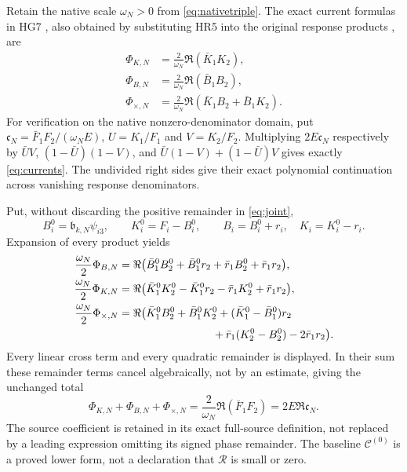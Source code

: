\documentclass[11pt]{article}
\begin{document}
Retain the native scale $\omega_N>0$ from \eqref{eq:nativetriple}.
The exact current formulas in HG7 \cite{HG}, also obtained by
substituting HR5 into the original response products \cite{HR}, are
\begin{equation}\label{eq:currents}
 \begin{aligned}
 \Phi_{K,N}&=\frac2{\omega_N}\Re(\bar K_1K_2),\\
 \Phi_{B,N}&=\frac2{\omega_N}\Re(\bar B_1B_2),\\
 \Phi_{\times,N}&=\frac2{\omega_N}
        \Re(\bar K_1B_2+\bar B_1K_2).
 \end{aligned}
\end{equation}
For verification on the native nonzero-denominator domain, put
$\mathfrak c_N=\bar F_1F_2/(\omega_NE)$, $U=K_1/F_1$ and
$V=K_2/F_2$.  Multiplying $2E\mathfrak c_N$ respectively by
$\bar UV$, $(1-\bar U)(1-V)$, and
$\bar U(1-V)+(1-\bar U)V$ gives exactly
\eqref{eq:currents}.  The undivided right sides give their exact
polynomial continuation across vanishing response denominators.

Put, without discarding the positive remainder in \eqref{eq:joint},
\[
 B_i^0=\mathfrak b_{k,N}\psi_{i3},\qquad
 K_i^0=F_i-B_i^0,\qquad B_i=B_i^0+r_i,\quad K_i=K_i^0-r_i.
\]
Expansion of every product yields
\begin{equation}\label{eq:currentremainders}
 \begin{aligned}
 \frac{\omega_N}2\Phi_{B,N}
 &=\Re\bigl(\bar B_1^0B_2^0+\bar B_1^0r_2
              +\bar r_1B_2^0+\bar r_1r_2\bigr),\\
 \frac{\omega_N}2\Phi_{K,N}
 &=\Re\bigl(\bar K_1^0K_2^0-\bar K_1^0r_2
              -\bar r_1K_2^0+\bar r_1r_2\bigr),\\
 \frac{\omega_N}2\Phi_{\times,N}
 &=\Re\bigl(\bar K_1^0B_2^0+\bar B_1^0K_2^0
       +(\bar K_1^0-\bar B_1^0)r_2\\
 &\hspace{30mm}+\bar r_1(K_2^0-B_2^0)-2\bar r_1r_2\bigr).
 \end{aligned}
\end{equation}
Every linear cross term and every quadratic remainder is displayed.
In their sum these remainder terms cancel algebraically, not by an
estimate, giving the unchanged total
\begin{equation}\label{eq:currenttotal}
 \Phi_{K,N}+\Phi_{B,N}+\Phi_{\times,N}
 =\frac2{\omega_N}\Re(\bar F_1F_2)
 =2E\Re\mathfrak c_N.
\end{equation}
The source coefficient is retained in its exact full-source definition,
not replaced by a leading expression omitting its signed phase remainder.
The baseline $\mathcal C^{(0)}$ is a proved lower form, not a declaration
that $\mathcal R$ is small or zero.
\end{document}
